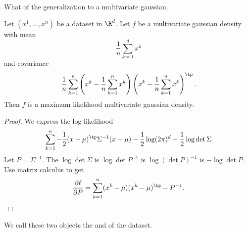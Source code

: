 

What of the generalization to a multivariate gaussian.


\begin{prop}
Let $(x^1, \dots, x^n)$ be a dataset in $\R^d$.
Let $f$ be a multivariate gaussian density with
mean
\[
  \frac{1}{n} \sum_{k = 1}^{d} x^k
\]
and covariance
\[
  \frac{1}{n}
  \sum_{k = 1}^{n}
  \left(x^k - \frac{1}{n} \sum_{k = 1}^{n} x^k\right)
  \left(x^k - \frac{1}{n} \sum_{k = 1}^{n} x^k\right)^\tp
  .
\]
Then $f$ is a maximum likelihood multivariate gaussian
density.
\begin{proof}
  We express the log likelihood
  \[
    \sum_{k = 1}^{n} -\frac{1}{2}(x - \mu)^\tp \Sigma^{-1} (x-\mu) - \frac{1}{2}\log (2\pi)^d - \frac{1}{2} \log \det \Sigma
  \]
  Let $P = \Sigma^{-1}$. The $\log\det \Sigma$ is $\log\det P^{-1}$ is $\log \left(\det P\right)^{-1}$ is $- \log\det P$.
  Use matrix calculus to get
  \[
    \frac{\partial \ell}{\partial P} = \sum_{k = 1}^{n} (x^k - \mu)(x^k - \mu)^\tp - P^{-1}.
  \]
\end{proof}
\end{prop}
We call these two objects
the 
and 
of the dataset.
